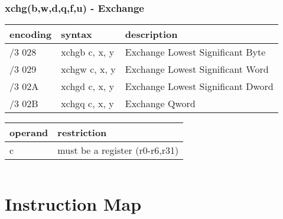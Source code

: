 \documentclass[letterpaper,10pt,openright,twoside,onecolumn]{book}
\begin{document}
\newpage\subsection{xchg(b,w,d,q,f,u) - Exchange}
  \begin{tabular}{|l|l|l|}
   \hline
    encoding & syntax & description \\
   \hline
    /3 028 & xchgb c, x, y & Exchange Lowest Significant Byte \\
    /3 029 & xchgw c, x, y & Exchange Lowest Significant Word \\
    /3 02A & xchgd c, x, y & Exchange Lowest Significant Dword \\
    /3 02B & xchgq c, x, y & Exchange Qword \\
   \hline
  \end{tabular}

  \flushleft
  \begin{tabular}{|l|l|}
   \hline
    operand & restriction \\
   \hline
    c & must be a register (r0-r6,r31) \\
   \hline
  \end{tabular}
  \begin{verbatim}
  \end{verbatim}

\appendix

\newlength{\icol}
\setlength{\icol}{0.2\textwidth}
\newlength{\ncol}
\setlength{\ncol}{0.05\textwidth}

\chapter{Instruction Map}
\end{document}
